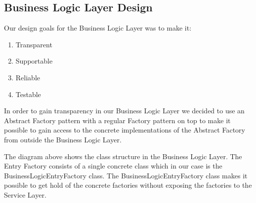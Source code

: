 \documentclass[../report.tex]{subfiles}
\begin{document}
\graphicspath{{img/}{../img/}}

\subsection{Business Logic Layer Design}

Our design goals for the Business Logic Layer was to make it:
\begin{enumerate}
\item Transparent
\item Supportable
\item Reliable
\item Testable
\end{enumerate}

In order to gain transparency in our Business Logic Layer we decided to use an Abstract Factory pattern with a regular Factory pattern on top to make it possible to gain access to the concrete implementations of the Abstract Factory from outside the Business Logic Layer.


The diagram above shows the class structure in the Business Logic Layer. The Entry Factory consists of a single concrete class which in our case is the BusinessLogicEntryFactory class. The BusinessLogicEntryFactory class makes it possible to get hold of the concrete factories without exposing the factories to the Service Layer.
\end{document}
